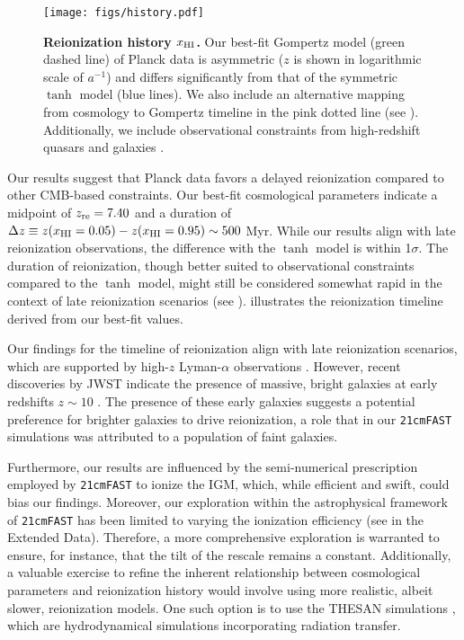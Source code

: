 \begin{figure}
\centering
\texttt{[image: figs/history.pdf]}
\caption{\textbf{Reionization history $x_{\mathrm{HI}}$.}
Our best-fit Gompertz model (green dashed line) of Planck data is
asymmetric ($z$ is shown in logarithmic scale of $a^{-1}$) and differs
significantly from that of the symmetric $\tanh$ model (blue lines).
We also include an alternative mapping from cosmology to Gompertz
timeline in the pink dotted line (see ).
Additionally, we include observational constraints from high-redshift
quasars \cite{Greig2017, Banados2018, Davies2018, Greig2019, Wang2020,
Yang2020, Greig2022, Jin2023} and galaxies \cite{Ouchi2010,
Sobacchi2015, Mason2018, Mason2019, Hoag2019, Mesinger2015}.}
\label{fig:history}
\end{figure}

Our results suggest that Planck data favors a delayed reionization
compared to other CMB-based constraints.
Our best-fit cosmological parameters indicate a midpoint of $z_{\mathrm{re}} =
7.40$ and a duration of $\Delta z \equiv z(x_{\mathrm{HI}} = 0.05) - z(x_{\mathrm{HI}} =
0.95) \sim 500 $ Myr.
While our results align with late reionization observations, the
difference with the $\tanh$ model is within 1$\sigma$.
The duration of reionization, though better suited to observational
constraints compared to the $\tanh$ model, might still be considered
somewhat rapid in the context of late reionization scenarios (see
\cite{Cain2021}).
 illustrates the reionization timeline derived
from our best-fit values.

Our findings for the timeline of reionization align with late
reionization scenarios, which are supported by high-$z$ Lyman-$\alpha$
observations \cite{Keating2020, Cain2021}.
However, recent discoveries by JWST indicate the presence of massive,
bright galaxies at early redshifts $z \sim 10$
\cite{Adams2023, Bradley2023, Donnan2023}.
The presence of these early galaxies suggests a potential preference for
brighter galaxies to drive reionization, a role that in our
\texttt{21cmFAST} simulations was attributed to a population of faint
galaxies.

Furthermore, our results are influenced by the semi-numerical
prescription employed by \texttt{21cmFAST} to ionize the IGM, which,
while efficient and swift, could bias our findings.
Moreover, our exploration within the astrophysical framework of
\texttt{21cmFAST} has been limited to varying the ionization efficiency
(see  in the Extended Data).
Therefore, a more comprehensive exploration is warranted to ensure, for
instance, that the tilt of the rescale remains a constant.
Additionally, a valuable exercise to refine the inherent relationship
between cosmological parameters and reionization history would involve
using more realistic, albeit slower, reionization models.
One such option is to use the THESAN simulations \cite{Kannan2022},
which are hydrodynamical simulations incorporating radiation transfer.



